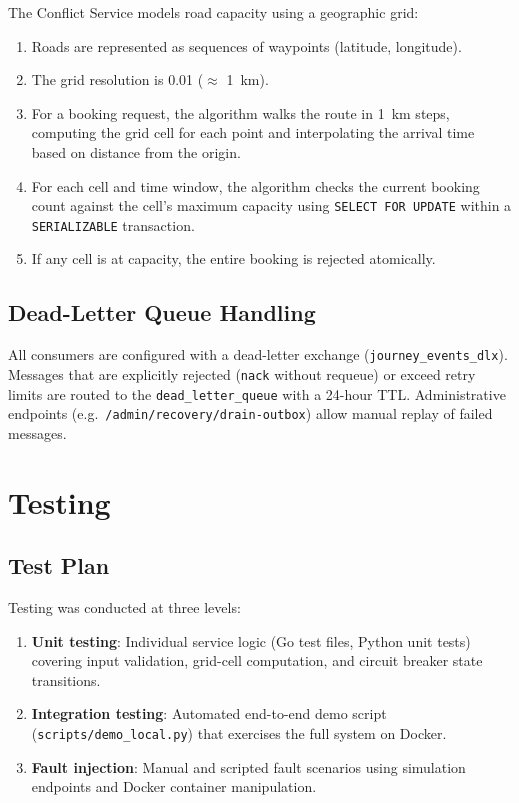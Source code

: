 \documentclass[12pt,a4paper]{article}
\begin{document}
The Conflict Service models road capacity using a geographic grid:

\begin{enumerate}[nosep]
  \item Roads are represented as sequences of waypoints (latitude, longitude).
  \item The grid resolution is 0.01\textdegree{} ($\approx$ 1~km).
  \item For a booking request, the algorithm walks the route in 1~km steps, computing the grid cell for each point and interpolating the arrival time based on distance from the origin.
  \item For each cell and time window, the algorithm checks the current booking count against the cell's maximum capacity using \texttt{SELECT FOR UPDATE} within a \texttt{SERIALIZABLE} transaction.
  \item If any cell is at capacity, the entire booking is rejected atomically.
\end{enumerate}

\subsection{Dead-Letter Queue Handling}

All consumers are configured with a dead-letter exchange (\texttt{journey\_events\_dlx}). Messages that are explicitly rejected (\texttt{nack} without requeue) or exceed retry limits are routed to the \texttt{dead\_letter\_queue} with a 24-hour TTL. Administrative endpoints (e.g.\ \texttt{/admin/recovery/drain-outbox}) allow manual replay of failed messages.

\section{Testing}

\subsection{Test Plan}

Testing was conducted at three levels:

\begin{enumerate}
  \item \textbf{Unit testing}: Individual service logic (Go test files, Python unit tests) covering input validation, grid-cell computation, and circuit breaker state transitions.
  \item \textbf{Integration testing}: Automated end-to-end demo script (\texttt{scripts/demo\_local.py}) that exercises the full system on Docker.
  \item \textbf{Fault injection}: Manual and scripted fault scenarios using simulation endpoints and Docker container manipulation.
\end{enumerate}
\end{document}
